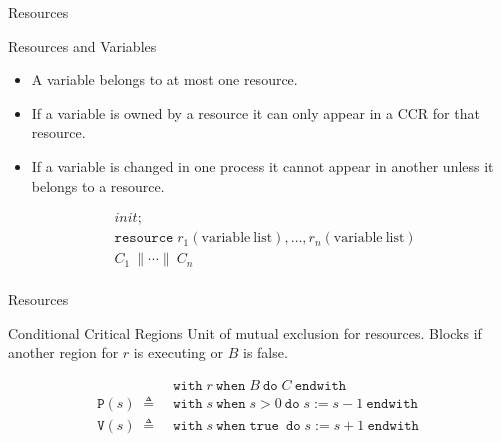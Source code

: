 \documentclass{beamer}
\newcommand{\mtt}[1]{
  \mathtt{#1}\;
}
\begin{document}
\begin{frame}{Resources}
  \begin{block}{Resources and Variables}
    \begin{itemize}
    \item{
        A variable belongs to at most one resource.
    }

    \item{
        If a variable is owned by a resource it can only appear in a CCR for that resource.
    }

    \item{
        If a variable is changed in one process it cannot appear in another unless it belongs to a resource.
    }
    \end{itemize}
  \end{block}
  \begin{example}
    \begin{align*}
      & init;\\
      & \mtt{resource} r_1\mathrm{(variable\ list)},\ldots,r_n\mathrm{(variable\ list)} \\
      & \mathit{C_1}\ \| \cdots \|\ \mathit{C_n}\\
    \end{align*}
  \end{example}

\end{frame}


\begin{frame}{Resources}
  \begin{block}{Conditional Critical Regions}
    Unit of mutual exclusion for resources. Blocks if another region for $r$ is executing or $B$ is false.
  \end{block}

  \begin{example}
    \begin{align*}
      \; &\mtt{with} r\ \mtt{when} B\ \mtt{do} C\ \mtt{endwith}\\
      \mathtt{P}(s)\; \triangleq\; &\mtt{with} s\ \mtt{when} s > 0\ \mtt{do} s := s - 1\ \mtt{endwith}\\
      \mathtt{V}(s)\; \triangleq\; &\mtt{with} s\ \mtt{when} \mtt{true}\ \mtt{do} s := s + 1\ \mtt{endwith}\\
    \end{align*}
  \end{example}
\end{frame}
\end{document}
